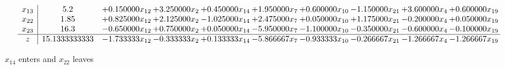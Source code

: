\documentclass[10pt]{article}
\begin{document}
\[\begin{array}{c| c c@{\hskip 2pt} c@{\hskip 2pt} c@{\hskip 2pt} c@{\hskip 2pt} c@{\hskip 2pt} c@{\hskip 2pt} c@{\hskip 2pt} c@{\hskip 2pt} }
 x_{13}   &  5.2 & + 0.150000 x_{12} & + 3.250000 x_{2} & + 0.450000 x_{14} & + 1.950000 x_{7} & + 0.600000 x_{10} & -1.150000 x_{21} & + 3.600000 x_{4} & + 0.600000 x_{19}\\
 x_{22}   &  1.85 & + 0.825000 x_{12} & + 2.125000 x_{2} & -1.025000 x_{14} & + 2.475000 x_{7} & + 0.050000 x_{10} & + 1.175000 x_{21} & -0.200000 x_{4} & + 0.050000 x_{19}\\
 x_{23}   &  16.3 & -0.650000 x_{12} & + 0.750000 x_{2} & + 0.050000 x_{14} & -5.950000 x_{7} & -1.100000 x_{10} & -0.350000 x_{21} & -0.600000 x_{4} & -0.100000 x_{19}\\
\hline
z    &  15.1333333333 & -1.733333 x_{12} & -0.333333 x_{2} & + 0.133333 x_{14} & -5.866667 x_{7} & -0.933333 x_{10} & -0.266667 x_{21} & -1.266667 x_{4} & -1.266667 x_{19}\\
\end{array}\]


 $ x_{14} $ enters and $ x_{22} $ leaves 
\end{document}

